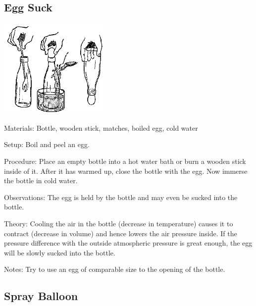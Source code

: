 \begin{multicols}{2}
\subsection{Egg Suck}

\begin{center}
\includegraphics[width=0.4\textwidth]{./img/source/egg-suck.png}
\end{center}

\begin{description*}
\item[Materials:]{Bottle, wooden stick, matches, boiled egg, cold water}
\item[Setup:]{Boil and peel an egg.}
\item[Procedure:]{Place an empty bottle into a hot water bath or burn a wooden stick inside of it. After it has warmed up, close the bottle with the egg. Now immerse the bottle in cold water.}
\item[Observations:]{The egg is held by the bottle and may even be sucked into the bottle.}
\item[Theory:]{Cooling the air in the bottle (decrease in temperature) causes it to contract (decrease in volume) and hence lowers the air pressure inside. If the pressure difference with the outside atmospheric pressure is great enough, the egg will be slowly sucked into the bottle.}
\item[Notes:]{Try to use an egg of comparable size to the opening of the bottle.}
\end{description*}

\subsection{Spray Balloon}



\end{multicols}
